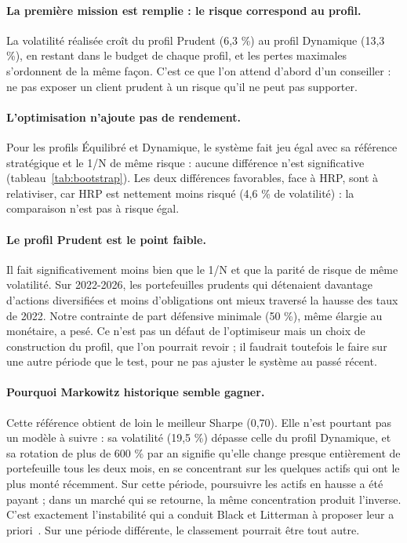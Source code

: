 \paragraph{La première mission est remplie : le risque correspond au profil.} La volatilité réalisée croît du profil Prudent (6,3 \%) au profil Dynamique (13,3 \%), en restant dans le budget de chaque profil, et les pertes maximales s'ordonnent de la même façon. C'est ce que l'on attend d'abord d'un conseiller : ne pas exposer un client prudent à un risque qu'il ne peut pas supporter.

\paragraph{L'optimisation n'ajoute pas de rendement.} Pour les profils Équilibré et Dynamique, le système fait jeu égal avec sa référence stratégique et le 1/N de même risque : aucune différence n'est significative (tableau~\ref{tab:bootstrap}). Les deux différences favorables, face à HRP, sont à relativiser, car HRP est nettement moins risqué (4,6 \% de volatilité) : la comparaison n'est pas à risque égal.

\paragraph{Le profil Prudent est le point faible.} Il fait significativement moins bien que le 1/N et que la parité de risque de même volatilité. Sur 2022-2026, les portefeuilles prudents qui détenaient davantage d'actions diversifiées et moins d'obligations ont mieux traversé la hausse des taux de 2022. Notre contrainte de part défensive minimale (50 \%), même élargie au monétaire, a pesé. Ce n'est pas un défaut de l'optimiseur mais un choix de construction du profil, que l'on pourrait revoir ; il faudrait toutefois le faire sur une autre période que le test, pour ne pas ajuster le système au passé récent.

\paragraph{Pourquoi \og Markowitz historique \fg{} semble gagner.} Cette référence obtient de loin le meilleur Sharpe (0,70). Elle n'est pourtant pas un modèle à suivre : sa volatilité (19,5 \%) dépasse celle du profil Dynamique, et sa rotation de plus de 600 \% par an signifie qu'elle change presque entièrement de portefeuille tous les deux mois, en se concentrant sur les quelques actifs qui ont le plus monté récemment. Sur cette période, poursuivre les actifs en hausse a été payant ; dans un marché qui se retourne, la même concentration produit l'inverse. C'est exactement l'instabilité qui a conduit Black et Litterman à proposer leur a priori~\cite{black1992}. Sur une période différente, le classement pourrait être tout autre.

